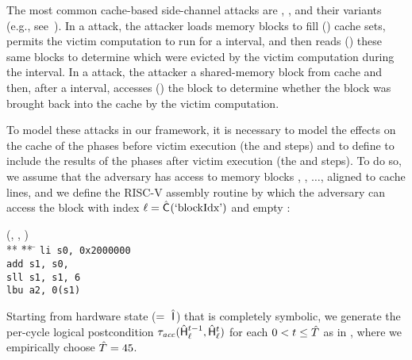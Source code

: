 The most common cache-based side-channel attacks are \primeprobe,
\flushreload, and their variants (e.g.,
see~\cite{zhang2012cross,yarom2014flush}).  In a \primeprobe attack,
the attacker loads memory blocks to fill (\Prime) cache sets, permits
the victim computation to run for a \primeprobe interval, and then
reads () these same blocks to determine which were evicted by
the victim computation during the \primeprobe interval.  In a
\flushreload attack, the attacker  a shared-memory block
from cache and then, after a \flushreload interval, accesses
() the block to determine whether the block was brought
back into the cache by the victim computation.

To model these attacks in our framework, it is necessary to model the
effects on the cache of the phases before victim execution (the \Prime
and \Flush steps) and to define \AOOFn{} to include the results of the
phases after victim execution (the \Probe and \Reload steps).  To do
so, we assume that the adversary has access to memory blocks
, , $\ldots$, \block{\blockNmbr} aligned to cache
lines, and we define the RISC-V assembly routine \accessProc by which
the adversary can access the block with index $\ell =
\hat{\mathsf{C}}_{}(\textrm{`blockIdx'})$ and empty \SecFnAccess{}:
\begin{center}
\begin{minipage}{0.6\columnwidth}
\begin{tabbing}
\accessProc(\ACIFnAccess{}, \AIIFnAccess{},  \SecFnAccess{}) \\
** \= ** \= \kill
\> \texttt{li s0, 0x2000000}\\ 
\> \texttt{add s1, s0, \blockIdx} \\
\> \texttt{sll s1, s1, 6}\\
\> \texttt{lbu a2, 0(s1)}
\end{tabbing}
\end{minipage}
\end{center}
Starting from hardware state 
($=~\hat{\mathsf{I}}_{}$) that is completely symbolic, we generate the
per-cycle logical postcondition
$\tau_{\mathit{acc}}(\hat{\mathsf{H}}_{\ell}^{t-1},
\hat{\mathsf{H}}_{\ell}^{t})$ for each $0 < t \le
\hat{T}$ as in , where we empirically
choose $\hat{T} = 45$.

